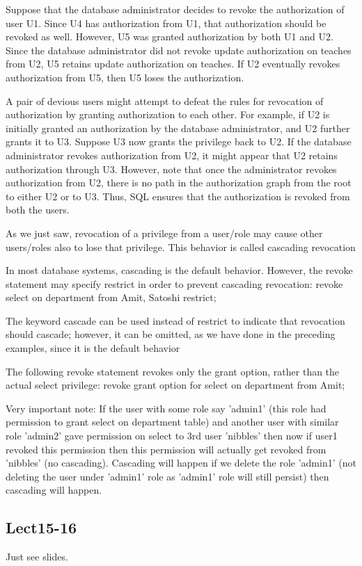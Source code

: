 \documentclass[8pt, a4paper, oneside, twocolumn]{extarticle}
\begin{document}
Suppose that the database administrator decides to revoke the authorization of
user U1. Since U4 has authorization from U1, that authorization should be revoked
as well. However, U5 was granted authorization by both U1 and U2. Since the
database administrator did not revoke update authorization on teaches from U2,
U5 retains update authorization on teaches. If U2 eventually revokes authorization
from U5, then U5 loses the authorization.

A pair of devious users might attempt to defeat the rules for revocation
of authorization by granting authorization to each other. For example, if U2 is
initially granted an authorization by the database administrator, and U2 further
grants it to U3. Suppose U3 now grants the privilege back to U2. If the database
administrator revokes authorization from U2, it might appear that U2 retains
authorization through U3. However, note that once the administrator revokes
authorization from U2, there is no path in the authorization graph from the root
to either U2 or to U3. Thus, SQL ensures that the authorization is revoked from
both the users.

As we just saw, revocation of a privilege from a user/role may cause other
users/roles also to lose that privilege. This behavior is called cascading revocation

In most database systems, cascading is the default behavior. However, the revoke
statement may specify restrict in order to prevent cascading revocation:
revoke select on department from Amit, Satoshi restrict;

The keyword cascade can be used instead of restrict to indicate that revocation
should cascade; however, it can be omitted, as we have done in the preceding
examples, since it is the default behavior

The following revoke statement revokes only the grant option, rather than
the actual select privilege:
revoke grant option for select on department from Amit;


Very important note: If the user with some role say 'admin1' (this role had permission to grant select on department table) and another user with similar role 'admin2' gave permission on select to 3rd user 'nibbles' then now if user1 revoked this permission then this permission will actually get revoked from 'nibbles' (no cascading). Cascading will happen if we delete the role 'admin1' (not deleting the user under 'admin1' role as 'admin1' role will still persist) then cascading will happen.
\subsection{Lect15-16}
Just see slides.
\end{document}
